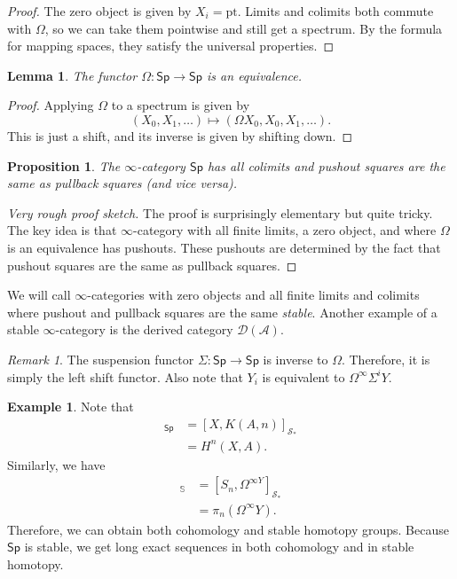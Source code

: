 \documentclass[10pt, oneside]{memoir}
\newtheorem{prop}[thm]{Proposition}
\newtheorem{lem}[thm]{Lemma}
\theoremstyle{definition}
\newtheorem{exm}[thm]{Example}
\theoremstyle{remark}
\newtheorem{rmk}[thm]{Remark}
\theoremstyle{plain}
\theoremstyle{definition}
\theoremstyle{remark}
\newcommand{\bS}{\mathbb{S}}
\newcommand{\mc}[1]{\mathcal{#1}}
\newcommand{\mr}[1]{\mathrm{#1}}
\newcommand{\ms}[1]{\mathsf{#1}}
\newcommand{\1}{\mathbf{1}}
\newcommand{\2}{\mathbf{2}}
\newcommand{\3}{\mathbf{3}}
\newcommand{\pt}{\mr{pt}}
\begin{document}
\begin{proof}
    The zero object is given by \(X_i = \pt \). Limits and colimits both commute with \(\Omega \), so we can take them pointwise and still get a spectrum. By the formula for mapping spaces, they satisfy the universal properties.
\end{proof}

\begin{lem}
    The functor \(\Omega \colon \ms{Sp} \to \ms{Sp} \) is an equivalence.
\end{lem}

\begin{proof}
    Applying \(\Omega \) to a spectrum is given by
    \[ (X_0, X_1, \ldots) \mapsto (\Omega X_0, X_0, X_1, \ldots). \]
    This is just a shift, and its inverse is given by shifting down.
\end{proof}

\begin{prop}
    The \(\infty \)-category \(\ms{Sp} \) has all colimits and pushout squares are the same as pullback squares (and vice versa).
\end{prop}


\begin{proof}[Very rough proof sketch]
    The proof is surprisingly elementary but quite tricky. The key idea is that \(\infty \)-category with all finite limits, a zero object, and where \(\Omega \) is an equivalence has pushouts. These pushouts are determined by the fact that pushout squares are the same as pullback squares.
\end{proof}

We will call \(\infty \)-categories with zero objects and all finite limits and colimits where pushout and pullback squares are the same \textit{stable}. Another example of a stable \(\infty \)-category is the derived category \(\mc{D}(\mc{A}) \).

\begin{rmk}
    The suspension functor \(\Sigma \colon \ms{Sp} \to \ms{Sp} \) is inverse to \(\Omega \). Therefore, it is simply the left shift functor. Also note that \(Y_i \) is equivalent to \(\Omega^{\infty} \Sigma^i Y \).
\end{rmk}

\begin{exm}
    Note that
    \begin{align*}
        [\Sigma^{\infty} X, \Sigma^n HA]_{\ms{Sp}} &= [X, K(A, n)]_{\mc{S}_*} \\
        &= H^n(X, A).
    \end{align*}
    Similarly, we have
    \begin{align*}
        [\Sigma^n \bS, Y]_{\bS} &= [S_n, \Omega^{\infty Y}]_{\mc{S}_*} \\
        &= \pi_n (\Omega^{\infty} Y).
    \end{align*}
    Therefore, we can obtain both cohomology and stable homotopy groups. Because \(\ms{Sp} \) is stable, we get long exact sequences in both cohomology and in stable homotopy.
\end{exm}
\end{document}
